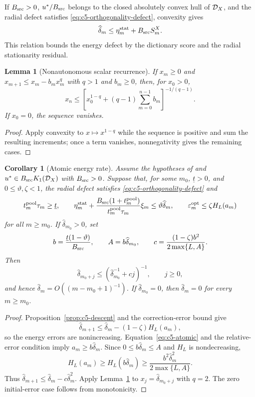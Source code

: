 \documentclass[11pt]{article}
\newtheorem{lemma}[theorem]{Lemma}
\newtheorem{corollary}[theorem]{Corollary}
\theoremstyle{remark}\newtheorem{remark}[theorem]{Remark}
\begin{document}
If $B_{\rm src}>0$, $u^*/B_{\rm src}$ belongs to the closed absolutely convex hull of $\mathcal D_X$, and the
radial defect satisfies \eqref{eq:c5-orthogonality-defect}, convexity gives
\begin{equation}
 \widehat\delta_m\leq\eta_m^{\rm stat}+B_{\rm src}S_m^X.
 \label{eq:c5-atomic}
\end{equation}
This relation bounds the energy defect by the dictionary score and the radial stationarity residual.

\begin{lemma}[Nonautonomous scalar recurrence]
\label{lem:c5-recurrence}
If $x_m\ge0$ and $x_{m+1}\le x_m-b_mx_m^q$ with $q>1$ and $b_m\ge0$, then, for
$x_0>0$,
\begin{equation}
 x_n\le\left[x_0^{1-q}+(q-1)\sum_{m=0}^{n-1}b_m\right]^{-1/(q-1)}.
 \label{eq:c5-recurrence}
\end{equation}
If $x_0=0$, the sequence vanishes.
\end{lemma}
\begin{proof}
Apply convexity to $x\mapsto x^{1-q}$ while the sequence is positive and sum the resulting increments; once a term vanishes, nonnegativity gives the remaining cases.
\end{proof}

\begin{corollary}[Atomic energy rate]
\label{cor:c5-atomic-rate}
Assume the hypotheses of  and
$u^*\in B_{\rm src}K_1(\mathcal D_X)$ with $B_{\rm src}>0$.
Suppose that, for some $m_0$, $\underline t>0$, and
$0\le\vartheta,\zeta<1$, the radial defect satisfies
\eqref{eq:c5-orthogonality-defect} and
\[
  t_m^{\rm pool}\tau_m\ge\underline t,\qquad
  \eta_m^{\rm stat}
    +\frac{B_{\rm src}(1+t_m^{\rm pool})}
                 {t_m^{\rm pool}\tau_m}\xi_m
    \le\vartheta\widehat\delta_m,\qquad
  \varepsilon_m^{\rm opt}\le\zeta H_L(a_m)
\]
for all $m\ge m_0$.
If $\widehat\delta_{m_0}>0$, set
\[
  b=\frac{\underline t(1-\vartheta)}{B_{\rm src}},
  \qquad A=b\widehat\delta_{m_0},
  \qquad c=\frac{(1-\zeta)b^2}{2\max\{L,A\}}.
\]
Then
\[
  \widehat\delta_{m_0+j}
    \le\left(\widehat\delta_{m_0}^{-1}+cj\right)^{-1},
  \qquad j\ge0,
\]
and hence
$\widehat\delta_m=O((m-m_0+1)^{-1})$.
If $\widehat\delta_{m_0}=0$, then
$\widehat\delta_m=0$ for every $m\ge m_0$.
\end{corollary}

\begin{proof}
Proposition~\ref{prop:c5-descent} and the correction-error bound give
\[
  \widehat\delta_{m+1}
    \le\widehat\delta_m-(1-\zeta)H_L(a_m),
\]
so the energy errors are nonincreasing.
Equation~\eqref{eq:c5-atomic} and the relative-error condition imply
$a_m\ge b\widehat\delta_m$.
Since $0\le b\widehat\delta_m\le A$ and $H_L$ is nondecreasing,
\[
  H_L(a_m)\ge H_L(b\widehat\delta_m)
    \ge\frac{b^2\widehat\delta_m^2}{2\max\{L,A\}}.
\]
Thus
$\widehat\delta_{m+1}\le
  \widehat\delta_m-c\widehat\delta_m^2$.
Apply Lemma~\ref{lem:c5-recurrence} to
$x_j=\widehat\delta_{m_0+j}$ with $q=2$.
The zero initial-error case follows from monotonicity.
\end{proof}
\end{document}
